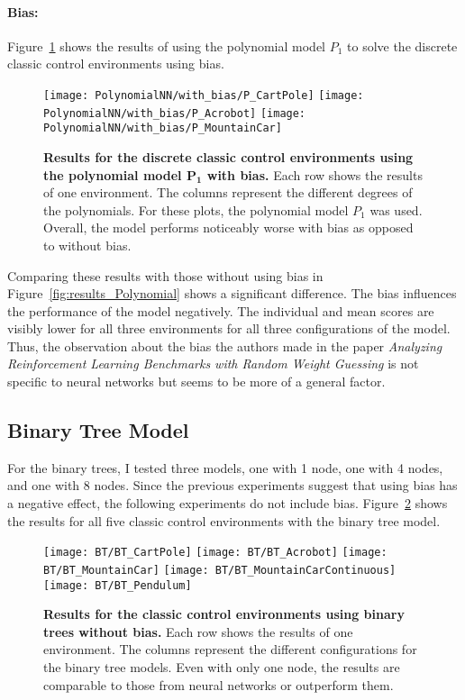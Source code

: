 \paragraph*{Bias:} Figure~\ref{fig:results_Polynomial_bias} shows the results of using the polynomial model $P_1$ to solve the discrete classic control environments using bias.
\begin{figure}[!ht]
  \centering
  \texttt{[image: PolynomialNN/with\_bias/P\_CartPole]}
  \texttt{[image: PolynomialNN/with\_bias/P\_Acrobot]}
  \texttt{[image: PolynomialNN/with\_bias/P\_MountainCar]}
\caption[Results for the discrete classic control environments using the polynomial model $\mathbf{P_1}$ with bias]{
  \textbf{Results for the discrete classic control environments using the polynomial model $\mathbf{P_1}$ with bias.}
   Each row shows the results of one environment. The columns represent the different degrees of the polynomials. For these plots, the polynomial model $P_1$ was used. Overall, the model performs noticeably worse with bias as opposed to without bias.
}
\label{fig:results_Polynomial_bias}
\end{figure}
Comparing these results with those without using bias in Figure~\ref{fig:results_Polynomial} shows a significant difference. The bias influences the performance of the model negatively. The individual and mean scores are visibly lower for all three environments for all three configurations of the model. Thus, the observation about the bias the authors made in the paper \emph{Analyzing Reinforcement Learning Benchmarks with Random Weight Guessing} is not specific to neural networks but seems to be more of a general factor.

\subsection{Binary Tree Model}
For the binary trees, I tested three models, one with 1 node, one with 4 nodes, and one with 8 nodes. Since the previous experiments suggest that using bias has a negative effect, the following experiments do not include bias. Figure~\ref{fig:results_BinaryTree} shows the results for all five classic control environments with the binary tree model.
\begin{figure}[!ht]
  \centering
  \texttt{[image: BT/BT\_CartPole]}
  \texttt{[image: BT/BT\_Acrobot]}
  \texttt{[image: BT/BT\_MountainCar]}
  \texttt{[image: BT/BT\_MountainCarContinuous]}
  \texttt{[image: BT/BT\_Pendulum]}
\caption[Results for the classic control environments using binary trees without bias]{
  \textbf{Results for the classic control environments using binary trees without bias.}
   Each row shows the results of one environment. The columns represent the different configurations for the binary tree models. Even with only one node, the results are comparable to those from neural networks or outperform them.
}
\label{fig:results_BinaryTree}
\end{figure}

